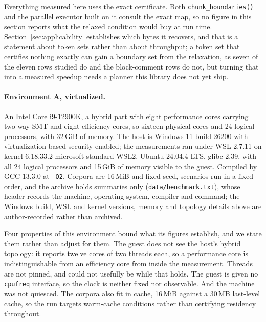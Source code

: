 \documentclass[11pt,a4paper]{article}
\theoremstyle{definition}
\theoremstyle{plain}
\newcommand{\code}[1]{\texttt{#1}}
\begin{document}
Everything measured here uses the exact certificate. Both \code{chunk\_boundaries()} and the parallel executor built on
it consult the exact map, so no figure in this section reports what the relaxed condition would buy at run time.
Section~\ref{sec:applicability} establishes which bytes it recovers, and that is a statement about token sets rather
than about throughput; a token set that certifies nothing exactly can gain a boundary set from the relaxation, as seven
of the eleven rows studied do and the block-comment rows do not, but turning that into a measured speedup needs a
planner this library does not yet ship.

\paragraph{Environment A, virtualized.} An Intel Core i9-12900K, a hybrid part with eight performance cores carrying
two-way SMT and eight efficiency cores, so sixteen physical cores and 24 logical processors, with 32\,GiB of memory.
The host is Windows 11 build 26200 with virtualization-based security enabled; the measurements ran under WSL 2.7.11
on kernel 6.18.33.2-microsoft-standard-WSL2, Ubuntu 24.04.4 LTS, glibc 2.39, with all 24 logical processors and
15\,GiB of memory visible to the guest. Compiled by GCC 13.3.0 at \code{-O2}. Corpora are 16\,MiB and fixed-seed,
scenarios run in a fixed order, and the archive holds summaries only (\code{data/benchmark.txt}), whose header
records the machine, operating system, compiler and command; the Windows build, WSL and kernel versions, memory and
topology details above are author-recorded rather than archived.

Four properties of this environment bound what its figures establish, and we state them rather than adjust for them. The
guest does not see the host's hybrid topology: it reports twelve cores of two threads each, so a performance core is
indistinguishable from an efficiency core from inside the measurement. Threads are not pinned, and could not usefully be
while that holds. The guest is given no \code{cpufreq} interface, so the clock is neither fixed nor observable. And the
machine was not quiesced. The corpora also fit in cache, 16\,MiB against a 30\,MB last-level cache, so the run targets
warm-cache conditions rather than certifying residency throughout.
\end{document}
